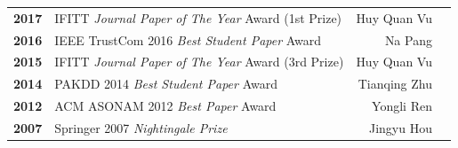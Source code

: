 \documentclass{tikzposter} %
\begin{document}
\begin{columns}
{{\begin{minipage}{\linewidth}
\begin{tabular}{ r | l | r  r }
						\textbf{2017} & IFITT \textit{Journal Paper of The Year} Award (1st Prize) & Huy Quan Vu &  \\
						
						\textbf{2016} & IEEE TrustCom 2016 \textit{Best Student Paper} Award & Na Pang &  \\
						
						\textbf{2015} & IFITT \textit{Journal Paper of The Year} Award (3rd Prize) & Huy Quan Vu &  \\
						
						\textbf{2014} & PAKDD 2014 \textit{Best Student Paper} Award & Tianqing Zhu &  \\
						
						\textbf{2012} & ACM ASONAM 2012  \textit{Best Paper} Award & Yongli Ren &  \\
						
						\textbf{2007} & Springer 2007 \textit{Nightingale Prize} & Jingyu Hou &  \\
						\bottomrule
					\end{tabular}
				\end{minipage}
			}		
		}
		
		
		
		
		
	\end{columns}
	
	
	
\end{document}
